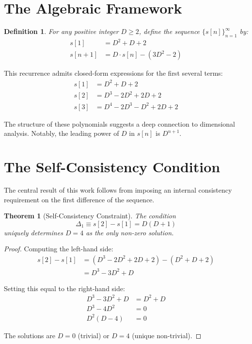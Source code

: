 \documentclass[twocolumn,showpacs,preprintnumbers,amsmath,amssymb,prl]{revtex4-2}
\newtheorem{theorem}{Theorem}
\newtheorem{definition}{Definition}
\begin{document}
\section{The Algebraic Framework}

\begin{definition}
For any positive integer $D \geq 2$, define the sequence $\{s[n]\}_{n=1}^{\infty}$ by:
\begin{align}
s[1] &= D^2 + D + 2 \label{eq:initial}\\
s[n+1] &= D \cdot s[n] - (3D^2 - 2) \label{eq:recurrence}
\end{align}
\end{definition}

This recurrence admits closed-form expressions for the first several terms:
\begin{align}
s[1] &= D^2 + D + 2 \\
s[2] &= D^3 - 2D^2 + 2D + 2 \\
s[3] &= D^4 - 2D^3 - D^2 + 2D + 2
\end{align}

The structure of these polynomials suggests a deep connection to dimensional analysis. Notably, the leading power of $D$ in $s[n]$ is $D^{n+1}$.

\section{The Self-Consistency Condition}

The central result of this work follows from imposing an internal consistency requirement on the first difference of the sequence.

\begin{theorem}[Self-Consistency Constraint]
\label{thm:main}
The condition
\begin{equation}
\Delta_1 \equiv s[2] - s[1] = D(D+1)
\label{eq:constraint}
\end{equation}
uniquely determines $D = 4$ as the only non-zero solution.
\end{theorem}

\begin{proof}
Computing the left-hand side:
\begin{align}
s[2] - s[1] &= (D^3 - 2D^2 + 2D + 2) - (D^2 + D + 2) \nonumber\\
&= D^3 - 3D^2 + D
\end{align}

Setting this equal to the right-hand side:
\begin{align}
D^3 - 3D^2 + D &= D^2 + D \\
D^3 - 4D^2 &= 0 \\
D^2(D - 4) &= 0
\end{align}

The solutions are $D = 0$ (trivial) or $D = 4$ (unique non-trivial).
\end{proof}
\end{document}

